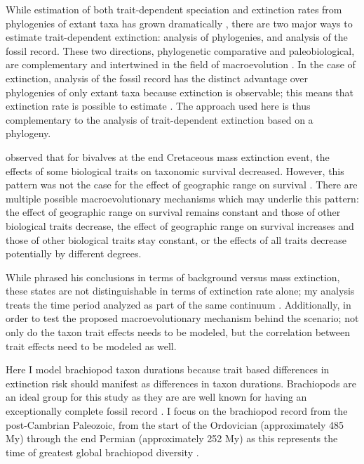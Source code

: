 \documentclass{article}
\begin{document}
While estimation of both trait-dependent speciation and extinction rates from phylogenies of extant taxa has grown dramatically \citep{Maddison2007,Fitzjohn2010,Goldberg2011a,Goldberg2005,Rabosky2013,Stadler2013b,Stadler2011a,Stadler2013a}, there are two major ways to estimate trait-dependent extinction: analysis of phylogenies, and analysis of the fossil record. These two directions, phylogenetic comparative and paleobiological, are complementary and intertwined in the field of macroevolution \citep{Rabosky2010b,Jablonski2008a,Hunt2014a}. In the case of extinction, analysis of the fossil record has the distinct advantage over phylogenies of only extant taxa because extinction is observable; this means that extinction rate is possible to estimate \citep{Rabosky2010a,Quental2009,Liow2010a}. The approach used here is thus complementary to the analysis of trait-dependent extinction based on a phylogeny.

\citet{Jablonski1986} observed that for bivalves at the end Cretaceous mass extinction event, the effects of some biological traits on taxonomic survival decreased. However, this pattern was not the case for the effect of geographic range on survival \citep{Jablonski1986,Payne2007}. There are multiple possible macroevolutionary mechanisms which may underlie this pattern: the effect of geographic range on survival remains constant and those of other biological traits decrease, the effect of geographic range on survival increases and those of other biological traits stay constant, or the effects of all traits decrease potentially by different degrees.

While \citet{Jablonski1986} phrased his conclusions in terms of background versus mass extinction, these states are not distinguishable in terms of extinction rate alone; my analysis treats the time period analyzed as part of the same continuum \citep{Wang2003,Payne2007,Simpson2009}. Additionally, in order to test the proposed macroevolutionary mechanism behind the \citet{Jablonski1986} scenario; not only do the taxon trait effects needs to be modeled, but the correlation between trait effects need to be modeled as well. 

Here I model brachiopod taxon durations because trait based differences in extinction risk should manifest as differences in taxon durations. Brachiopods are an ideal group for this study as they are are well known for having an exceptionally complete fossil record \citep{Foote1996e,Foote2000a}. I focus on the brachiopod record from the post-Cambrian Paleozoic, from the start of the Ordovician (approximately 485 My) through the end Permian (approximately 252 My) as this represents the time of greatest global brachiopod diversity \citep{Alroy2010}.
\end{document}
